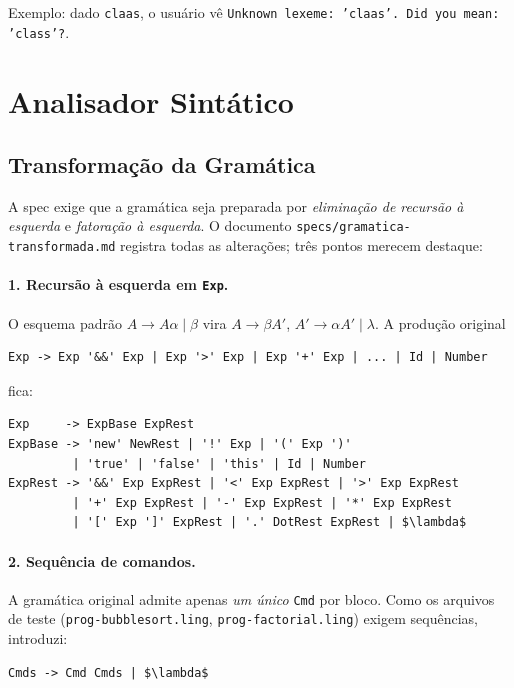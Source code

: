 \documentclass[12pt,a4paper]{article}
\begin{document}
Exemplo: dado \verb|claas|, o usuário vê
\texttt{Unknown lexeme: 'claas'. Did you mean: 'class'?}.

\section{Analisador Sintático}

\subsection{Transformação da Gramática}

A spec exige que a gramática seja preparada por \emph{eliminação de
recursão à esquerda} e \emph{fatoração à esquerda}. O documento
\texttt{specs/gramatica-transformada.md} registra todas as alterações;
três pontos merecem destaque:

\paragraph{1. Recursão à esquerda em \texttt{Exp}.} O esquema padrão
$A \to A\alpha \mid \beta$ vira $A \to \beta A'$, $A' \to \alpha A'
\mid \lambda$. A produção original

\begin{verbatim}
Exp -> Exp '&&' Exp | Exp '>' Exp | Exp '+' Exp | ... | Id | Number
\end{verbatim}

\noindent fica:

\begin{verbatim}
Exp     -> ExpBase ExpRest
ExpBase -> 'new' NewRest | '!' Exp | '(' Exp ')'
         | 'true' | 'false' | 'this' | Id | Number
ExpRest -> '&&' Exp ExpRest | '<' Exp ExpRest | '>' Exp ExpRest
         | '+' Exp ExpRest | '-' Exp ExpRest | '*' Exp ExpRest
         | '[' Exp ']' ExpRest | '.' DotRest ExpRest | $\lambda$
\end{verbatim}

\paragraph{2. Sequência de comandos.} A gramática original admite
apenas \emph{um único} \texttt{Cmd} por bloco. Como os arquivos de
teste (\texttt{prog-bubblesort.ling}, \texttt{prog-factorial.ling})
exigem sequências, introduzi:

\begin{verbatim}
Cmds -> Cmd Cmds | $\lambda$
\end{verbatim}
\end{document}
